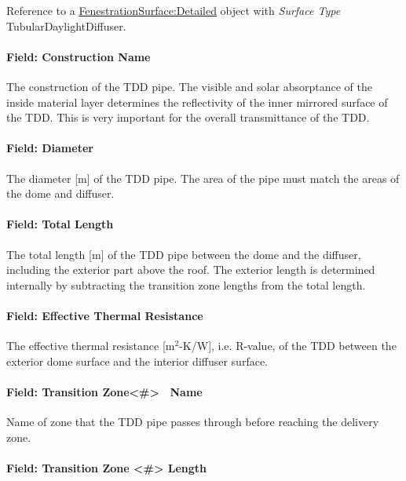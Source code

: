 Reference to a \hyperref[fenestrationsurfacedetailed]{FenestrationSurface:Detailed} object with \emph{Surface Type} TubularDaylightDiffuser.

\paragraph{Field: Construction Name}\label{field-construction-name-001}

The construction of the TDD pipe. The visible and solar absorptance of the inside material layer determines the reflectivity of the inner mirrored surface of the TDD. This is very important for the overall transmittance of the TDD.

\paragraph{Field: Diameter}\label{field-diameter}

The diameter {[}m{]} of the TDD pipe. The area of the pipe must match the areas of the dome and diffuser.

\paragraph{Field: Total Length}\label{field-total-length}

The total length {[}m{]} of the TDD pipe between the dome and the diffuser, including the exterior part above the roof. The exterior length is determined internally by subtracting the transition zone lengths from the total length.

\paragraph{Field: Effective Thermal Resistance}\label{field-effective-thermal-resistance}

The effective thermal resistance {[}m\(^{2}\)-K/W{]}, i.e. R-value, of the TDD between the exterior dome surface and the interior diffuser surface.

\paragraph{Field: Transition Zone\textless{}\#\textgreater{}~ Name}\label{field-transition-zone-name}

Name of zone that the TDD pipe passes through before reaching the delivery zone.

\paragraph{Field: Transition Zone \textless{}\#\textgreater{} Length}\label{field-transition-zone-length}


